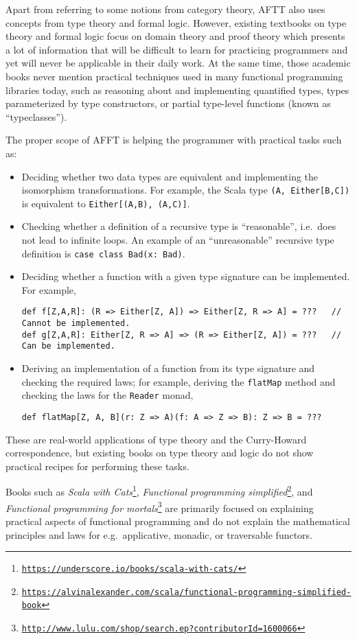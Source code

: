 Apart from referring to some notions from category theory, AFTT also
uses concepts from type theory and formal logic. However, existing
textbooks on type theory and formal logic focus on domain theory and
proof theory \textendash{} which presents a lot of information that
will be difficult to learn for practicing programmers and yet will
never be applicable in their daily work. At the same time, those academic
books never mention practical techniques used in many functional programming
libraries today, such as reasoning about and implementing quantified
types, types parameterized by type constructors, or partial type-level
functions (known as ``typeclasses'').

The proper scope of AFFT is helping the programmer with practical
tasks such as:
\begin{itemize}
\item Deciding whether two data types are equivalent and implementing the
isomorphism transformations. For example, the Scala type \lstinline!(A, Either[B,C])!
is equivalent to \lstinline!Either[(A,B), (A,C)]!.
\item Checking whether a definition of a recursive type is ``reasonable'',
i.e.~does not lead to infinite loops. An example of an ``unreasonable''
recursive type definition is \lstinline!case class Bad(x: Bad)!.
\item Deciding whether a function with a given type signature can be implemented.
For example, 
\begin{lstlisting}
def f[Z,A,R]: (R => Either[Z, A]) => Either[Z, R => A] = ???   // Cannot be implemented.
def g[Z,A,R]: Either[Z, R => A] => (R => Either[Z, A]) = ???   // Can be implemented.
\end{lstlisting}
\item Deriving an implementation of a function from its type signature and
checking the required laws; for example, deriving the \lstinline!flatMap!
method and checking the laws for the \lstinline!Reader! monad,
\begin{lstlisting}
def flatMap[Z, A, B](r: Z => A)(f: A => Z => B): Z => B = ???
\end{lstlisting}
\end{itemize}
These are real-world applications of type theory and the Curry-Howard
correspondence, but existing books on type theory and logic do not
show practical recipes for performing these tasks.

Books such as \emph{Scala with Cats}\footnote{\texttt{\href{https://underscore.io/books/scala-with-cats/}{https://underscore.io/books/scala-with-cats/}}},
\emph{Functional programming simplified}\footnote{\texttt{\href{https://alvinalexander.com/scala/functional-programming-simplified-book}{https://alvinalexander.com/scala/functional-programming-simplified-book}}},
and \emph{Functional programming for mortals}\footnote{\texttt{\href{http://www.lulu.com/shop/search.ep?contributorId=1600066}{http://www.lulu.com/shop/search.ep?contributorId=1600066}}}
are primarily focused on explaining practical aspects of functional
programming and do not explain the mathematical principles and laws
for e.g.~applicative, monadic, or traversable functors.

